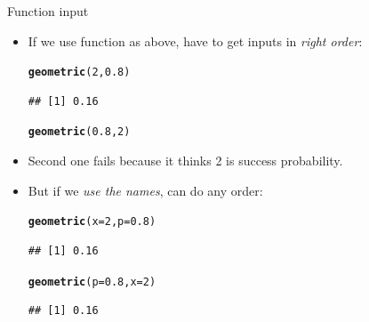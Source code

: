 \documentclass[unknownkeysallowed]{beamer}\usepackage[]{graphicx}\usepackage[]{color}
\makeatletter
\newcommand{\hlnum}[1]{\textcolor[rgb]{0.686,0.059,0.569}{#1}}%
\newcommand{\hlstd}[1]{\textcolor[rgb]{0.345,0.345,0.345}{#1}}%
\newcommand{\hlkwc}[1]{\textcolor[rgb]{0.333,0.667,0.333}{#1}}%
\newcommand{\hlkwd}[1]{\textcolor[rgb]{0.737,0.353,0.396}{\textbf{#1}}}%
\newenvironment{kframe}{%
 \def\at@end@of@kframe{}%
 \ifinner\ifhmode%
  \def\at@end@of@kframe{\end{minipage}}%
  \begin{minipage}{\columnwidth}%
 \fi\fi%
 \def\FrameCommand##1{\hskip\@totalleftmargin \hskip-\fboxsep
 \colorbox{shadecolor}{##1}\hskip-\fboxsep
     \hskip-\linewidth \hskip-\@totalleftmargin \hskip\columnwidth}%
 \MakeFramed {\advance\hsize-\width
   \@totalleftmargin\z@ \linewidth\hsize
   \@setminipage}}%
 {\par\unskip\endMakeFramed%
 \at@end@of@kframe}
\newenvironment{knitrout}{}{} %
\makeatother
\begin{document}
\begin{frame}[fragile]{Function input}
  
  \begin{itemize}
  \item If we use function as above, have to get inputs in \emph{right
    order}:
\begin{knitrout}
\color{fgcolor}\begin{kframe}
\begin{alltt}
\hlkwd{geometric}\hlstd{(}\hlnum{2}\hlstd{,}\hlnum{0.8}\hlstd{)}
\end{alltt}
\begin{verbatim}
## [1] 0.16
\end{verbatim}
\begin{alltt}
\hlkwd{geometric}\hlstd{(}\hlnum{0.8}\hlstd{,}\hlnum{2}\hlstd{)}
\end{alltt}


{\ttfamily\noindent\bfseries\color{errorcolor}{\#\# Error: p <= 1 is not TRUE}}\end{kframe}
\end{knitrout}
\item Second one fails because it thinks 2 is success probability.
\item But if we \emph{use the names}, can do any order:
\begin{knitrout}
\color{fgcolor}\begin{kframe}
\begin{alltt}
\hlkwd{geometric}\hlstd{(}\hlkwc{x}\hlstd{=}\hlnum{2}\hlstd{,}\hlkwc{p}\hlstd{=}\hlnum{0.8}\hlstd{)}
\end{alltt}
\begin{verbatim}
## [1] 0.16
\end{verbatim}
\begin{alltt}
\hlkwd{geometric}\hlstd{(}\hlkwc{p}\hlstd{=}\hlnum{0.8}\hlstd{,}\hlkwc{x}\hlstd{=}\hlnum{2}\hlstd{)}
\end{alltt}
\begin{verbatim}
## [1] 0.16
\end{verbatim}
\end{kframe}
\end{knitrout}
  \end{itemize}
  
\end{frame}
\end{document}
